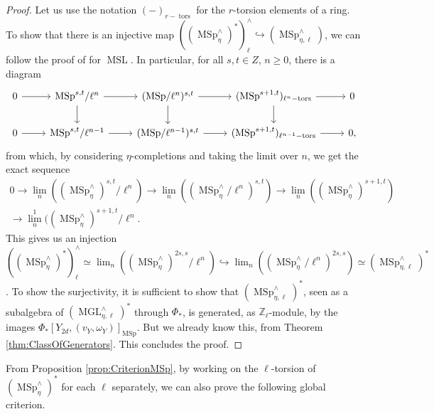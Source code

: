 \documentclass[10pt]{amsart}
\theoremstyle{definition}
\theoremstyle{plain}
\numberwithin{equation}{section}
\newcommand{\0}{\emptyset}
\newcommand{\Z}{{\mathbb Z}}
\newcommand{\MGL}{{\operatorname{MGL}}}
\newcommand{\MSL}{{\operatorname{MSL}}}
\newcommand{\MSp}{{\operatorname{MSp}}}
\newcommand{\tors}{{\operatorname{tors}}}
\begin{document}
\begin{proof}
     Let us use the notation $(-)_{r-\tors}$ for the $r$-torsion elements of a ring. To show that there is an injective map $((\MSp^\wedge_\eta)^*)^\wedge_\ell\hookrightarrow (\MSp_{\eta,\ell}^\wedge)$, we can follow the proof of \cite[Lemma 6.13 (3)]{lev:ellcoh} for $\MSL$. In particular, for all $s,t \in Z$, $n \ge 0$, there is a diagram
    $$
    \begin{tikzcd}
        0 \arrow[r] & \MSp^{s,t}/\ell^n \arrow[r] \arrow[d] & (\MSp/\ell^n)^{s,t} \arrow[r] \arrow[d] & (\MSp^{s+1,t})_{\ell^n-\tors} \arrow[r] \arrow[d] & 0 \\
        0 \arrow[r] & \MSp^{s,t}/\ell^{n-1} \arrow[r] & (\MSp/\ell^{n-1})^{s,t} \arrow[r] & (\MSp^{s+1,t})_{\ell^{n-1}-\tors} \arrow[r] & 0,
    \end{tikzcd}
    $$
    from which, by considering $\eta$-completions and taking the limit over $n$, we get the exact sequence
    \begin{multline*}
        0 \to \lim_n((\MSp_\eta^\wedge)^{s,t}/\ell^n) \to \lim_n((\MSp_\eta^\wedge /\ell^n)^{s,t}) \to \lim_n((\MSp_\eta^\wedge)^{s+1,t}) \\ \to \lim_n^1((\MSp_\eta^\wedge)^{s+1,t}/\ell^n.
    \end{multline*}
    This gives us an injection $((\MSp^\wedge_\eta)^*)^\wedge_\ell \simeq \lim_n((\MSp_\eta^\wedge)^{2s,s}/\ell^n) \hookrightarrow \lim_n((\MSp_\eta^\wedge /\ell^n)^{2s,s}) \simeq (\MSp_{\eta,\ell}^\wedge)^*$. To show the surjectivity, it is sufficient to show that $(\MSp_{\eta,\ell}^\wedge)^*$, seen as a subalgebra of $(\MGL_{\eta,\ell}^\wedge)^*$ through $\Phi_*$, is generated, as $\Z_\ell$-module, by the images $\Phi_*[Y_{2d}, (v_Y,\omega_Y)]_\MSp$. But we already know this, from Theorem \ref{thm:ClassOfGenerators}. This concludes the proof.
\end{proof}

From Proposition \ref{prop:CriterionMSp}, by working on the $\ell$-torsion of $(\MSp_\eta^\wedge)^*$ for each $\ell$ separately, we can also prove the following global criterion.
\end{document}

